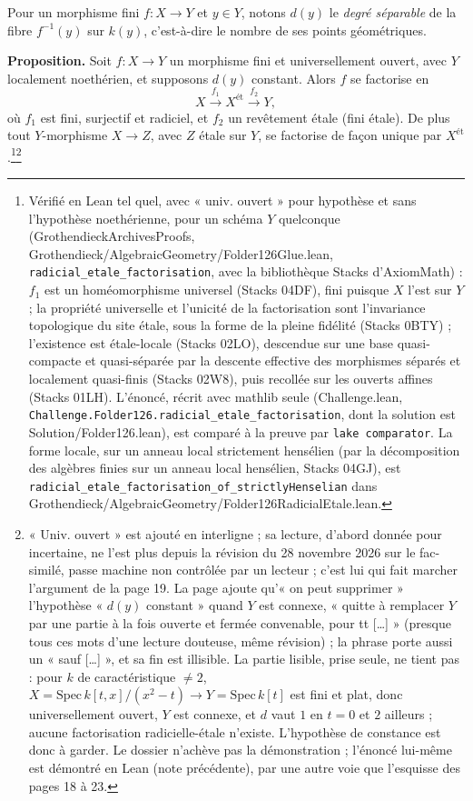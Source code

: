 \documentclass[11pt,a4paper]{article}
\begin{document}
Pour un morphisme fini $f : X \to Y$ et $y \in Y$, notons $d(y)$ le
\emph{degré séparable} de la fibre $f^{-1}(y)$ sur $k(y)$, c'est-à-dire le
nombre de ses points géométriques.

\textbf{Proposition.} Soit $f : X \to Y$ un morphisme fini et universellement
ouvert, avec $Y$ localement noethérien, et supposons $d(y)$ constant. Alors
$f$ se factorise en
\[
  X \xrightarrow{\ f_1\ } X^{\text{ét}} \xrightarrow{\ f_2\ } Y ,
\]
où $f_1$ est fini, surjectif et radiciel, et $f_2$ un revêtement étale (fini
étale). De plus tout $Y$-morphisme $X \to Z$, avec $Z$ étale sur $Y$, se
factorise de façon unique par $X^{\text{ét}}$.\footnote{Vérifié en Lean tel quel, avec
« univ. ouvert » pour hypothèse et sans l'hypothèse noethérienne, pour un schéma
$Y$ quelconque (GrothendieckArchivesProofs, Grothendieck/AlgebraicGeometry/Folder126Glue.lean,
\texttt{radicial\_etale\_factorisation}, avec la bibliothèque Stacks d'AxiomMath) :
$f_1$ est un homéomorphisme universel (Stacks 04DF), fini puisque $X$ l'est sur $Y$ ;
la propriété universelle et l'unicité de la factorisation sont l'invariance
topologique du site étale, sous la forme de la pleine fidélité (Stacks 0BTY) ;
l'existence est étale-locale (Stacks 02LO), descendue sur une base quasi-compacte et
quasi-séparée par la descente effective des morphismes séparés et localement
quasi-finis (Stacks 02W8), puis recollée sur les ouverts affines (Stacks 01LH).
L'énoncé, récrit avec mathlib seule (Challenge.lean,
\texttt{Challenge.Folder126.radicial\_etale\_factorisation}, dont la solution est
Solution/Folder126.lean), est comparé à la
preuve par \texttt{lake comparator}. La forme locale, sur un anneau local
strictement hensélien (par la décomposition des algèbres finies sur un anneau
local hensélien, Stacks 04GJ), est
\texttt{radicial\_etale\_factorisation\_of\_strictlyHenselian} dans
Grothendieck/AlgebraicGeometry/Folder126RadicialEtale.lean.}\footnote{« Univ. ouvert » est
ajouté en interligne ; sa lecture, d'abord donnée pour incertaine, ne l'est plus
depuis la révision du 28 novembre 2026 sur le fac-similé, passe machine non contrôlée par un lecteur ; c'est lui qui fait marcher
l'argument de la page 19. La page ajoute qu'« on peut supprimer » l'hypothèse
« $d(y)$ constant » quand $Y$ est connexe, « quitte à remplacer $Y$ par une
partie à la fois ouverte et fermée convenable, pour tt […] » (presque tous ces
mots d'une lecture douteuse, même révision) ; la phrase porte aussi un « sauf […] », et sa fin est
illisible. La partie lisible, prise seule, ne tient pas : pour $k$ de caractéristique $\neq 2$, $X = \mathrm{Spec}\,
k[t, x]/(x^2 - t) \to Y = \mathrm{Spec}\, k[t]$ est fini et plat, donc
universellement ouvert, $Y$ est connexe, et $d$ vaut $1$ en $t = 0$ et $2$
ailleurs ; aucune factorisation radicielle-étale n'existe. L'hypothèse de
constance est donc à garder. Le dossier n'achève pas la démonstration ; l'énoncé
lui-même est démontré en Lean (note précédente), par une autre voie que
l'esquisse des pages 18 à 23.}
\end{document}
